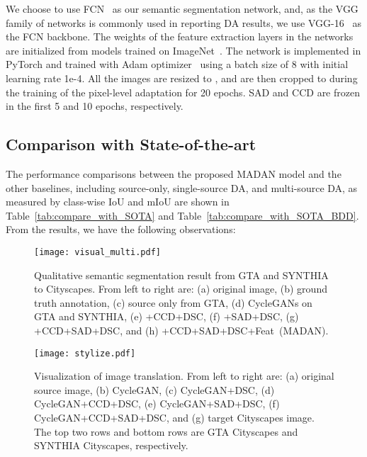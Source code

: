 \documentclass{article}
\begin{document}
We choose to use FCN~\cite{long2015fully} as our semantic segmentation network, and, as the VGG family of networks is commonly used in reporting DA results, we use VGG-16~\cite{vgg} as the FCN backbone. The weights of the feature extraction layers in the networks are initialized from models trained on ImageNet~\cite{deng2009imagenet}. The network is implemented in PyTorch and trained with Adam optimizer~\cite{adam} using a batch size of 8 with initial learning rate 1e-4. All the images are resized to , and are then cropped to  during the training of the pixel-level adaptation for 20 epochs. SAD and CCD are frozen in the first 5 and 10 epochs, respectively.


















\subsection{Comparison with State-of-the-art}
The performance comparisons between the proposed MADAN model and the other baselines, including source-only, single-source DA, and multi-source DA, as measured by class-wise IoU and mIoU are shown in Table~\ref{tab:compare_with_SOTA} and Table~\ref{tab:compare_with_SOTA_BDD}. From the results, we have the following observations:


\begin{figure}
\centering
\texttt{[image: visual\_multi.pdf]}
\caption{Qualitative semantic segmentation result from GTA and SYNTHIA to Cityscapes. From left to right are: (a) original image, (b) ground truth annotation, (c) source only from GTA, (d) CycleGANs on GTA and SYNTHIA, (e) +CCD+DSC, (f) +SAD+DSC, (g) +CCD+SAD+DSC, and (h) +CCD+SAD+DSC+Feat~(MADAN).}
\label{fig:visual_multi}
\end{figure}

\begin{figure}
\centering
\texttt{[image: stylize.pdf]}
\caption{Visualization of image translation. From left to right are: (a) original source image, (b) CycleGAN, (c) CycleGAN+DSC, (d) CycleGAN+CCD+DSC, (e) CycleGAN+SAD+DSC, (f) CycleGAN+CCD+SAD+DSC, and (g) target Cityscapes image. The top two rows and bottom rows are GTA  Cityscapes and SYNTHIA   Cityscapes, respectively.}
\label{fig:stylize}
\end{figure}
\end{document}
